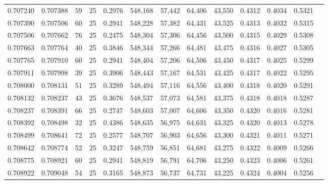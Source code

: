 \begin{tabular}{rrrrrrrrrrrrr}
0.707240 & 0.707388 &    59 &  25 &                                     0.2976 & 548,168 &  57,442 &  64,406 &  43,550 & 0.4312 & 0.4034 & 0.5321 \\
0.707390 & 0.707506 &    60 &  25 &                                     0.2941 & 548,228 &  57,382 &  64,431 &  43,525 & 0.4313 & 0.4032 & 0.5315 \\
0.707506 & 0.707662 &    76 &  25 &                                     0.2475 & 548,304 &  57,306 &  64,456 &  43,500 & 0.4315 & 0.4029 & 0.5308 \\
0.707663 & 0.707764 &    40 &  25 &                                     0.3846 & 548,344 &  57,266 &  64,481 &  43,475 & 0.4316 & 0.4027 & 0.5305 \\
0.707765 & 0.707910 &    60 &  25 &                                     0.2941 & 548,404 &  57,206 &  64,506 &  43,450 & 0.4317 & 0.4025 & 0.5299 \\
0.707911 & 0.707998 &    39 &  25 &                                     0.3906 & 548,443 &  57,167 &  64,531 &  43,425 & 0.4317 & 0.4022 & 0.5295 \\
0.708000 & 0.708131 &    51 &  25 &                                     0.3289 & 548,494 &  57,116 &  64,556 &  43,400 & 0.4318 & 0.4020 & 0.5291 \\
0.708132 & 0.708237 &    43 &  25 &                                     0.3676 & 548,537 &  57,073 &  64,581 &  43,375 & 0.4318 & 0.4018 & 0.5287 \\
0.708237 & 0.708391 &    66 &  25 &                                     0.2747 & 548,603 &  57,007 &  64,606 &  43,350 & 0.4320 & 0.4016 & 0.5281 \\
0.708392 & 0.708498 &    32 &  25 &                                     0.4386 & 548,635 &  56,975 &  64,631 &  43,325 & 0.4320 & 0.4013 & 0.5278 \\
0.708499 & 0.708641 &    72 &  25 &                                     0.2577 & 548,707 &  56,903 &  64,656 &  43,300 & 0.4321 & 0.4011 & 0.5271 \\
0.708642 & 0.708774 &    52 &  25 &                                     0.3247 & 548,759 &  56,851 &  64,681 &  43,275 & 0.4322 & 0.4009 & 0.5266 \\
0.708775 & 0.708921 &    60 &  25 &                                     0.2941 & 548,819 &  56,791 &  64,706 &  43,250 & 0.4323 & 0.4006 & 0.5261 \\
0.708922 & 0.709048 &    54 &  25 &                                     0.3165 & 548,873 &  56,737 &  64,731 &  43,225 & 0.4324 & 0.4004 & 0.5256 \\

\end{tabular}
